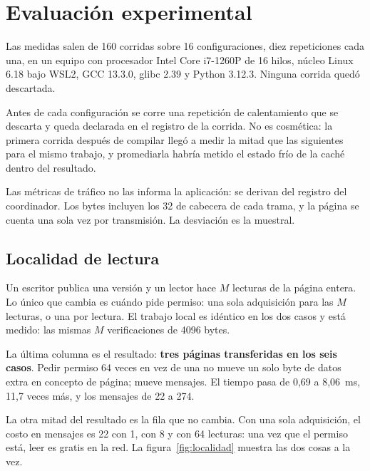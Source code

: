 \section{Evaluación experimental}

Las medidas salen de 160 corridas sobre 16 configuraciones, diez repeticiones
cada una, en un equipo con procesador Intel Core i7-1260P de 16 hilos, núcleo
Linux 6.18 bajo WSL2, GCC 13.3.0, glibc 2.39 y Python 3.12.3. Ninguna corrida
quedó descartada.

Antes de cada configuración se corre una repetición de calentamiento que se
descarta y queda declarada en el registro de la corrida. No es cosmética: la
primera corrida después de compilar llegó a medir la mitad que las siguientes
para el mismo trabajo, y promediarla habría metido el estado frío de la caché
dentro del resultado.

Las métricas de tráfico no las informa la aplicación: se derivan del registro
del coordinador. Los bytes incluyen los 32 de cabecera de cada trama, y la
página se cuenta una sola vez por transmisión. La desviación es la muestral.

\subsection{Localidad de lectura}

Un escritor publica una versión y un lector hace $M$ lecturas de la página
entera. Lo único que cambia es cuándo pide permiso: una sola adquisición para
las $M$ lecturas, o una por lectura. El trabajo local es idéntico en los dos
casos y está medido: las mismas $M$ verificaciones de 4096 bytes.

\begin{table}[t]
\caption{Localidad de lectura con dos nodos y un lector.}
\label{tab:localidad}
\centering
\small

\end{table}

La última columna es el resultado: \textbf{tres páginas transferidas en los
seis casos}. Pedir permiso 64 veces en vez de una no mueve un solo byte de
datos extra en concepto de página; mueve mensajes. El tiempo pasa de 0,69 a
8,06~ms, 11,7 veces más, y los mensajes de 22 a 274.

La otra mitad del resultado es la fila que no cambia. Con una sola
adquisición, el costo en mensajes es 22 con 1, con 8 y con 64 lecturas: una
vez que el permiso está, leer es gratis en la red. La figura~\ref{fig:localidad}
muestra las dos cosas a la vez.

